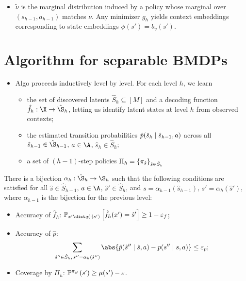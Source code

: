 \documentclass[11pt, openany]{book}
\begin{document}
\begin{itemize}
    \item $\tilde\nu$ is the marginal distribution induced by a policy whose marginal over $(s_{h-1},a_{h-1})$ matches $\nu$. Any minimizer $g_h$ yields context embeddings corresponding to state embeddings $\phi(s')=b_v(s')$.
\end{itemize}

\section{Algorithm for separable BMDPs}
\begin{itemize}
    \item Algo proceeds inductively level by level. For each level $h$, we learn
        \begin{itemize}
            \item the set of discovered latents $\hat{S}_h\subseteq [M]$ and a decoding function $\hat f_h : \X\to\hat\S_h$, letting us identify latent states at level $h$ from observed contexts;
            \item the estimated transition probabilities $\hat p(\hat s_h \mid \hat s_{h-1},a)$ across all $\hat s_{h-1}\in\hat\S_{h-1}$, $a\in\A$, $\hat s_h \in\hat S_h$;
        \item a set of $(h-1)$-step policies $\Pi_h = \left\lbrace\pi_{\hat s}\right\rbrace_{\hat s\in\hat S_h}$
        \end{itemize}
\end{itemize}

\begin{theorem}
    There is a bijection $\alpha_h : \hat\S_h \to \S_h$ such that the following conditions are satisfied for all $\hat s\in\hat S_{h-1}$, $a\in\A$, $\hat s'\in\hat S_h$, and $s=\alpha_{h-1}(\hat s_{h-1})$, $s'=\alpha_h(\hat s')$, where $\alpha_{h-1}$ is the bijection for the previous level:
    \begin{itemize}
        \item Accuracy of $\hat f_h$: $\P_{x'\dist q(\cdot\given s')} \left[ \hat f_h(x') = \hat s'\right] \geq 1-\eps_f$;
        \item Accuracy of $\hat p$:
            \[
                \sum_{\hat s''\in\hat S_h,\, s''=\alpha_h(\hat s'')} \abs{ \hat p(\hat s '' \given \hat s, a) - p(s'' \given s,a)} \leq \eps_p;
            \]
        \item Coverage by $\Pi_h$: $\mathbb{P}^{\pi_{\hat s'}} (s') \geq \mu(s')-\varepsilon$.
    \end{itemize}
\end{theorem}
\end{document}
